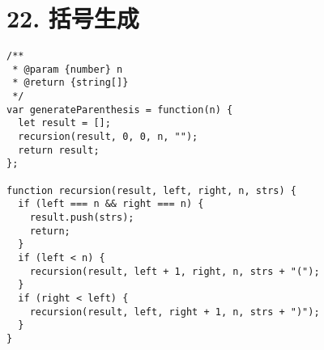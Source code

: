 \newpage
\section{22. 括号生成}
\label{leetcode:22}

\begin{verbatim}
/**
 * @param {number} n
 * @return {string[]}
 */
var generateParenthesis = function(n) {
  let result = [];
  recursion(result, 0, 0, n, "");
  return result;
};

function recursion(result, left, right, n, strs) {
  if (left === n && right === n) {
    result.push(strs);
    return;
  }
  if (left < n) {
    recursion(result, left + 1, right, n, strs + "(");
  }
  if (right < left) {
    recursion(result, left, right + 1, n, strs + ")");
  }
}
\end{verbatim}
